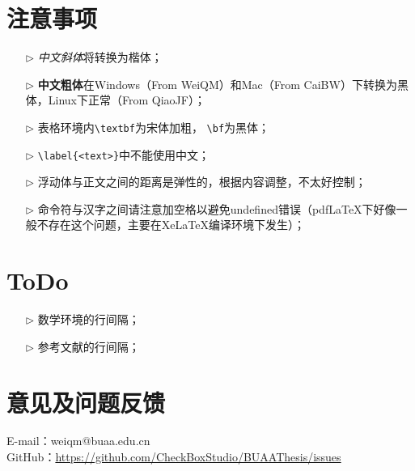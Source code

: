\section{注意事项}
\begin{itemize}
  \item[$\triangleright$] \textit{中文斜体}将转换为楷体；
  \item[$\triangleright$] \textbf{中文粗体}在Windows（From WeiQM）和Mac（From CaiBW）下转换为黑体，Linux下正常（From QiaoJF）；
  \item[$\triangleright$] 表格环境内\verb|\textbf|为宋体加粗， \verb|\bf|为黑体；
  \item[$\triangleright$] \verb|\label{<text>}|中不能使用中文；
  \item[$\triangleright$] 浮动体与正文之间的距离是弹性的，根据内容调整，不太好控制；
  \item[$\triangleright$] 命令符与汉字之间请注意加空格以避免undefined错误（pdfLaTeX下好像一般不存在这个问题，主要在XeLaTeX编译环境下发生）；
\end{itemize}

\section{ToDo}
\begin{itemize}
  \item[$\triangleright$] 数学环境的行间隔；
  \item[$\triangleright$] 参考文献的行间隔；
\end{itemize}

\section{意见及问题反馈}

\indent E-mail：weiqm@buaa.edu.cn \\
\indent GitHub：\href{https://github.com/CheckBoxStudio/BUAAThesis/issues}{https://github.com/CheckBoxStudio/BUAAThesis/issues}
